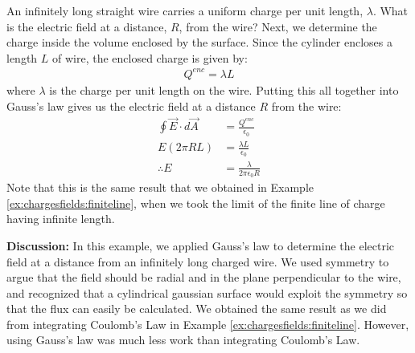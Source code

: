 \begin{example}{An infinitely long straight wire carries a uniform charge per unit length, $\lambda$. What is the electric field at a distance, $R$, from the wire?}
Next, we determine the charge inside the volume enclosed by the surface. Since the cylinder encloses a length $L$ of wire, the enclosed charge is given by:
\begin{align*}
Q^{enc}=\lambda L
\end{align*}
where $\lambda$ is the charge per unit length on the wire. Putting this all together into Gauss's law gives us the electric field at a distance $R$ from the wire:
\begin{align*}
\oint \vec E\cdot d\vec A&=\frac{Q^{enc}}{\epsilon_0} \\
E(2\pi R L) &= \frac{\lambda L}{\epsilon_0}\\
\therefore E&= \frac{\lambda}{2\pi\epsilon_0R}
\end{align*}
Note that this is the same result that we obtained in Example \ref{ex:chargesfields:finiteline}, when we took the limit of the finite line of charge having infinite length.

\textbf{Discussion: }In this example, we applied Gauss's law to determine the electric field at a distance from an infinitely long charged wire. We used symmetry to argue that the field should be radial and in the plane perpendicular to the wire, and recognized that a cylindrical gaussian surface would exploit the symmetry so that the flux can easily be calculated. We obtained the same result as we did from integrating Coulomb's Law in Example \ref{ex:chargesfields:finiteline}. However, using Gauss's law was much less work than integrating Coulomb's Law.

\end{example}

